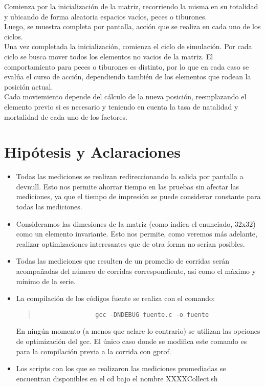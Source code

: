 \documentclass[a4paper,10pt]{article}
\begin{document}
Comienza por la inicializaci\'on de la matriz, recorriendo la misma en su totalidad y ubicando de forma aleatoria espacios vac\'ios, peces o tiburones. \\ 
Luego, se muestra completa por pantalla, acci\'on que se realiza en cada uno de los ciclos.\\

Una vez completada la inicializaci\'on, comienza el ciclo de simulaci\'on. Por cada ciclo se busca mover todos los elementos no vacios de la matriz. El comportamiento para
peces o tiburones es distinto, por lo que en cada caso se eval\'ua el curso de acci\'on, dependiendo tambi\'en de los elementos que rodean la posici\'on actual.\\

Cada moviemiento depende del c\'alculo de la nueva posici\'on, reemplazando el elemento previo si es necesario y teniendo en cuenta la tasa de natalidad y mortalidad de cada uno de los factores.

\section{Hip\'otesis y Aclaraciones}

\begin{itemize}
 \item {Todas las mediciones se realizan redireccionando la salida por pantalla a \/dev\/null. Esto nos permite ahorrar tiempo en las pruebas sin afectar las mediciones, ya que el tiempo de impresi\'on se puede considerar constante para todas las mediciones.}
 
 \item {Consideramos las dimesiones de la matriz (como indica el enunciado, 32x32) como un elemento invariante. Esto nos permite, como veremos m\'as adelante, realizar optimizaciones interesantes que de otra forma no ser\'ian posibles.}
 
 \item {Todas las mediciones que resulten de un promedio de corridas ser\'an acompa\~nadas del n\'umero de corridas correspondiente, as\'i como el m\'aximo y m\'inimo de la serie.}
 \item {La compilaci\'on de los c\'odigos fuente se realiza con el comando: 
		\begin{quote}
			\begin{verbatim}
				gcc -DNDEBUG fuente.c -o fuente
			\end{verbatim}
		\end{quote}
	En ning\'un momento (a menos que aclare lo contrario) se utilizan las opciones de optimizaci\'on del gcc. El \'unico caso donde se modifica este comando es para la compilaci\'on previa a la corrida con gprof.}
 \item {Los scripts con los que se realizaron las mediciones promediadas se encuentran disponibles en el cd bajo el nombre XXXXCollect.sh}
 
\end{itemize}
	
\end{document}
